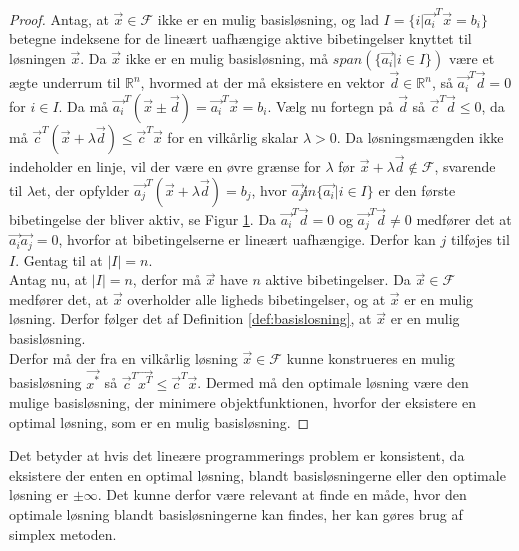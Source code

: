 \begin{proof}
Antag, at $\vec{x} \in \mathcal{F}$ ikke er en mulig basisløsning, og lad $I =\{i | \vec{a_i}^T\vec{x}=b_i\}$ betegne indeksene for de lineært uafhængige aktive bibetingelser knyttet til løsningen $\vec{x}$.
Da $\vec{x}$ ikke er en mulig basisløsning, må $span(\{\vec{a_i}|i\in I\})$ være et ægte underrum til $\mathds{R}^n$, hvormed at der må eksistere en vektor $\vec{d} \in \mathds{R}^n$, så $\vec{a_i}^T\vec{d}=0$ for $i \in I$.
Da må $\vec{a_i}^T(\vec{x}\pm \vec{d})= \vec{a_i}^T\vec{x}=b_i$.
Vælg nu fortegn på $\vec{d}$ så $\vec{c}^T\vec{d}\leq 0$, da må $\vec{c}^T(\vec{x}+\lambda\vec{d}) \leq \vec{c}^T\vec{x}$ for en vilkårlig skalar $\lambda > 0$.
Da løsningsmængden ikke indeholder en linje, vil der være en øvre grænse for $\lambda$ før $\vec{x}+\lambda\vec{d} \notin \mathcal{F}$, svarende til $\lambda$et, der opfylder $\vec{a_j}^T(\vec{x}+\lambda\vec{d})=b_j$, hvor $\vec{a_j} \not in \{\vec{a_i}|i\in I\}$ er den første bibetingelse der bliver aktiv, se Figur \ref{fig:eksistens}.
Da $\vec{a_i}^T\vec{d}=0$ og $\vec{a_j}^T\vec{d} \neq 0$ medfører det at $\vec{a_i}\vec{a_j} =0$, hvorfor at bibetingelserne er lineært uafhængige. 
Derfor kan $j$ tilføjes til $I$.
Gentag til at $|I|=n$.
\\ Antag nu, at $|I|=n$, derfor må $\vec{x}$ have $n$ aktive bibetingelser.
Da $\vec{x}\in \mathcal{F}$ medfører det, at $\vec{x}$ overholder alle ligheds bibetingelser, og at $\vec{x}$ er en mulig løsning. 
Derfor følger det af Definition \ref{def:basislosning}, at $\vec{x}$ er en mulig basisløsning.
\\Derfor må der fra en vilkårlig løsning $\vec{x}\in \mathcal{F}$ kunne konstrueres en mulig basisløsning $\vec{x^*}$ så $\vec{c}^T\vec{x^T} \leq \vec{c}^T \vec{x}$.
Dermed må den optimale løsning være den mulige basisløsning, der minimere objektfunktionen, hvorfor der eksistere en optimal løsning, som er en mulig basisløsning.
\end{proof}
\begin{figure}
\begin{center}
	
	\label{fig:eksistens}
\end{center}
\end{figure}
Det betyder at hvis det lineære programmerings problem er konsistent, da eksistere der enten en optimal løsning, blandt basisløsningerne eller den optimale løsning er $\pm \infty$.
Det kunne derfor være relevant at finde en måde, hvor den optimale løsning blandt basisløsningerne kan findes, her kan gøres brug af simplex metoden.



